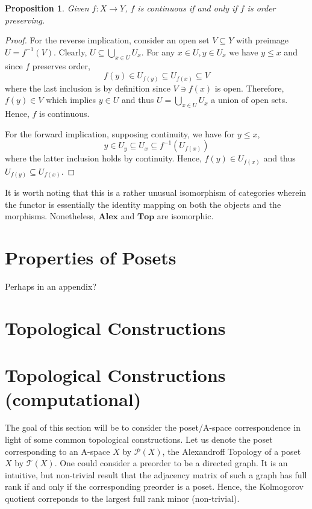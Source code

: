 \documentclass[paper=a4, fontsize=11pt]{scrartcl} %
\numberwithin{equation}{section} %
\numberwithin{figure}{section} %
\numberwithin{table}{section} %
\newtheorem{proposition}[theorem]{Proposition}
\theoremstyle{definition}
\theoremstyle{remark}
\DeclareMathOperator{\Union}{\mathop{\bigcup}}
\newcommand{\cat}[1]{\ensuremath{\mathbf{#1}} }
\newcommand{\Al}{\cat{Alex}}
\newcommand{\poset}[1]{\mathcal{P}\left( #1 \right) }
\newcommand{\T}[1]{\mathcal{T}\left( #1 \right)}
\newcommand{\Top}{\cat{Top}}
\newcommand{\union}[2]{\Union_{#1} #2}
\begin{document}
\begin{proposition}
  Given $f:X\rightarrow Y$, $f$ is continuous if and only if $f$ is order preserving.
\end{proposition}
\begin{proof}
  For the reverse implication, consider an open set $V\subseteq Y$ with preimage $U=f^{-1}\left( V \right)$.
  Clearly, $U\subseteq \union{x\in U}{U_x}$.
  For any $x\in U,y\in U_x$ we have $y\leq x$ and since $f$ preserves order, 
  $$f(y)\in U_{f(y)}\subseteq U_{f(x)}\subseteq V $$
  where the last inclusion is by definition since $V\ni f(x)$ is open.
  Therefore, $f(y)\in V$ which implies $y\in U$ and thus $U= \union{x\in U}{U_x}$ a union of open sets. 
  Hence, $f$ is continuous.

  For the forward implication, supposing continuity, we have for $y\leq x$, 
  $$y\in U_y\subseteq U_x \subseteq f^{-1}\left( U_{f(x)} \right) $$
  where the latter inclusion holds by continuity.
  Hence, $f(y)\in U_{f(x)}$ and thus $U_{f(y)}\subseteq U_{f(x)}$.
\end{proof}

It is worth noting that this is a rather unusual isomorphism of categories wherein the functor is essentially the identity mapping on both the objects and the morphisms. Nonetheless, \Al and \Top are isomorphic.  
\section{Properties of Posets}
Perhaps in an appendix?
\section{Topological Constructions}

\section{Topological Constructions (computational)}
The goal of this section will be to consider the poset/A-space correspondence in light of some common topological constructions. 
Let us denote the poset corresponding to an A-space $X$ by $\poset{X}$, the Alexandroff Topology of a poset $X$ by $\T{X}$.
One could consider a preorder to be a directed graph.
It is an intuitive, but non-trivial result that the adjacency matrix of such a graph has full rank if and only if the corresponding preorder is a poset.
Hence, the Kolmogorov quotient correponds to the largest full rank minor (non-trivial).
\end{document}
